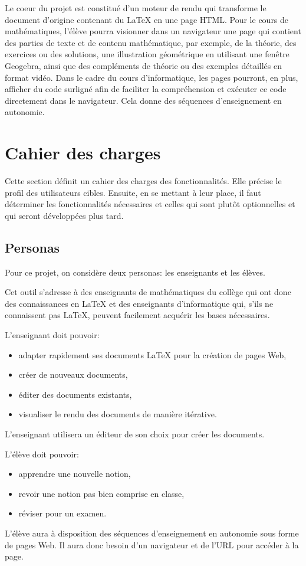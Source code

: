 \documentclass[12pt,titlepage,oneside]{article}
\begin{document}
Le coeur du projet est constitué d'un moteur de rendu qui transforme le document d'origine contenant du LaTeX en une page HTML. Pour le cours de mathématiques, l'élève pourra visionner dans un navigateur une page qui contient des parties de texte et de contenu mathématique, par exemple, de la théorie, des exercices ou des solutions, une illustration géométrique en utilisant une fenêtre Geogebra, ainsi que des compléments de théorie ou des exemples détaillés en format vidéo. Dans le cadre du cours d'informatique, les pages pourront, en plus, afficher du code surligné afin de faciliter la compréhension et exécuter ce code directement dans le navigateur. Cela donne des séquences d'enseignement en autonomie.

\newpage

\section{Cahier des charges}
Cette section définit un cahier des charges des fonctionnalités. Elle précise le profil des utilisateurs cibles. Ensuite, en se mettant à leur place, il faut déterminer les fonctionnalités nécessaires et celles qui sont plutôt optionnelles et qui seront développées plus tard.

\subsection{Personas}
Pour ce projet, on considère deux personas: les enseignants et les élèves.\par
Cet outil s'adresse à des enseignants de mathématiques du collège qui ont donc des connaissances en LaTeX et des enseignants d'informatique qui, s'ils ne connaissent pas LaTeX, peuvent facilement acquérir les bases nécessaires.\par
L'enseignant doit pouvoir:
\begin{itemize}
\item adapter rapidement ses documents LaTeX pour la création de pages Web,
\item créer de nouveaux documents,
\item éditer des documents existants,
\item visualiser le rendu des documents de manière itérative.
\end{itemize}
L'enseignant utilisera un éditeur de son choix pour créer les documents.\par
L'élève doit pouvoir:
\begin{itemize}
\item apprendre une nouvelle notion,
\item revoir une notion pas bien comprise en classe,
\item réviser pour un examen.
\end{itemize}
L'élève aura à disposition des séquences d'enseignement en autonomie sous forme de pages Web. Il aura donc besoin d'un navigateur et de l'URL pour accéder à la page.
\end{document}
